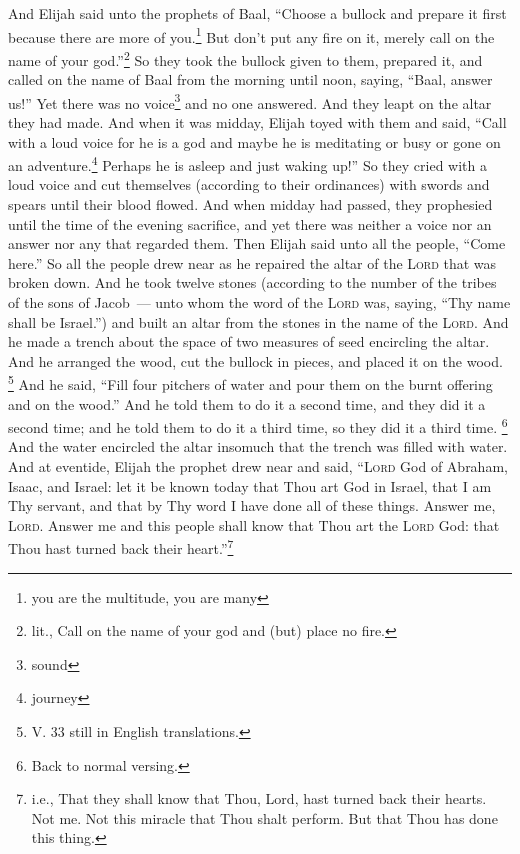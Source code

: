 \begin{inparaenum}
     And Elijah said unto the prophets of Baal, ``Choose a bullock and prepare it first because there are more of you.\footnote{you are the multitude, you are many} But don't put any fire on it, merely call on the name of your god.''\footnote{lit., Call on the name of your god and (but) place no fire.}%
     So they took the bullock given to them, prepared it, and called on the name of Baal from the morning until noon, saying, ``Baal, answer us!'' Yet there was no voice\footnote{sound} and no one answered. And they leapt on the altar they had made.%
     And when it was midday, Elijah toyed with them and said, ``Call with a loud voice for he is a god and maybe he is meditating or busy or gone on an adventure.\footnote{journey} Perhaps he is asleep and just waking up!''%
     So they cried with a loud voice and cut themselves (according to their ordinances) with swords and spears until their blood flowed.%
     And when midday had passed, they prophesied until the time of the evening sacrifice, and yet there was neither a voice nor an answer nor any that regarded them.%
     Then Elijah said unto all the people, ``Come here.'' So all the people drew near as he repaired the altar of the \textsc{Lord} that was broken down.%
     And he took twelve stones (according to the number of the tribes of the sons of Jacob~--- unto whom the word of the \textsc{Lord} was, saying, ``Thy name shall be Israel.'')%
     and built an altar from the stones in the name of the \textsc{Lord}. And he made a trench about the space of two measures of seed encircling the altar.%
     And he arranged the wood, cut the bullock in pieces, and placed it on the wood.%
     \footnote{V. 33 still in English translations.} And he said, ``Fill four pitchers of water and pour them on the burnt offering and on the wood.'' And he told them to do it a second time, and they did it a second time; and he told them to do it a third time, so they did it a third time.%
     \footnote{Back to normal versing.} And the water encircled the altar insomuch that the trench was filled with water.%
     And at eventide, Elijah the prophet drew near and said, ``\textsc{Lord} God of Abraham, Isaac, and Israel: let it be known today that Thou art God in Israel, that I am Thy servant, and that by Thy word I have done all of these things.%
     Answer me, \textsc{Lord}. Answer me and this people shall know that Thou art the \textsc{Lord} God: that Thou hast turned back their heart.''\footnote{i.e., That they shall know that Thou, Lord, hast turned back their hearts. Not me. Not this miracle that Thou shalt perform. But that Thou has done this thing.}%

\end{inparaenum}
